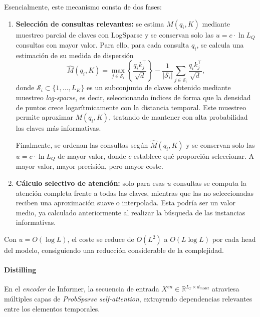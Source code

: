 Esencialmente, este mecanismo consta de dos fases:
\begin{enumerate}
	\item \textbf{Selección de consultas relevantes:} se estima \(M(q_i,K)\) mediante muestreo parcial de claves con LogSparse y se conservan solo las \(u = c \cdot \ln L_Q\) consultas con mayor valor.
	Para ello, para cada consulta \(q_i\), se calcula una estimación de su medida de dispersión
	\begin{equation}
		\hat{M}(q_i, K) = \max_{j \in \mathcal{S}_i} \left\{ \frac{q_i k_j^\top}{\sqrt{d}} \right\} - \frac{1}{|\mathcal{S}_i|} \sum_{j \in \mathcal{S}_i} \frac{q_i k_j^\top}{\sqrt{d}},
	\end{equation}
	donde \(\mathcal{S}_i \subset \{1, \dots, L_K\}\) es un subconjunto de claves obtenido mediante muestreo \textit{log-sparse}, es decir, seleccionando índices de forma que la densidad de puntos crece logarítmicamente con la distancia temporal.  
	Este muestreo permite aproximar \(M(q_i, K)\), tratando de mantener con alta probabilidad las claves más informativas. 
	
	Finalmente, se ordenan las consultas según \(\hat{M}(q_i, K)\) y se conservan solo las \(u = c \cdot \ln L_Q\) de mayor valor, donde \(c\) establece qué proporción seleccionar. A mayor valor, mayor precisión, pero mayor coste.
	
	\item \textbf{Cálculo selectivo de atención:} solo para esas \(u\) consultas se computa la atención completa frente a todas las claves, mientras que las no seleccionadas reciben una aproximación suave o interpolada. Esta podría ser un valor medio, ya calculado anteriormente al realizar la búsqueda de las instancias informativas.
\end{enumerate}

Con \(u = O(\log L)\), el coste se reduce de \(O(L^2)\) a \(O(L \log L)\) por cada head del modelo, consiguiendo una reducción considerable de la complejidad.

\paragraph{Distilling}

En el \textit{encoder} de Informer, la secuencia de entrada \(X^{en} \in \mathbb{R}^{L_x \times d_{model}}\) atraviesa múltiples capas de \textit{ProbSparse self-attention}, extrayendo dependencias relevantes entre los elementos temporales.\\

